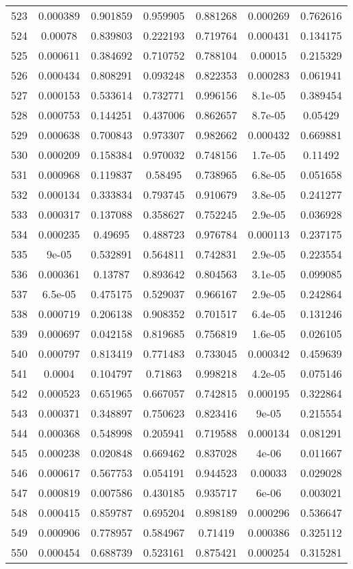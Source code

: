 \begin{table}
\begin{tabular}{c|c|c|c|c|c|c}
523 & 0.000389 & 0.901859 & 0.959905 & 0.881268 & 0.000269 & 0.762616\\
524 & 0.00078 & 0.839803 & 0.222193 & 0.719764 & 0.000431 & 0.134175\\
525 & 0.000611 & 0.384692 & 0.710752 & 0.788104 & 0.00015 & 0.215329\\
526 & 0.000434 & 0.808291 & 0.093248 & 0.822353 & 0.000283 & 0.061941\\
527 & 0.000153 & 0.533614 & 0.732771 & 0.996156 & 8.1e-05 & 0.389454\\
528 & 0.000753 & 0.144251 & 0.437006 & 0.862657 & 8.7e-05 & 0.05429\\
529 & 0.000638 & 0.700843 & 0.973307 & 0.982662 & 0.000432 & 0.669881\\
530 & 0.000209 & 0.158384 & 0.970032 & 0.748156 & 1.7e-05 & 0.11492\\
531 & 0.000968 & 0.119837 & 0.58495 & 0.738965 & 6.8e-05 & 0.051658\\
532 & 0.000134 & 0.333834 & 0.793745 & 0.910679 & 3.8e-05 & 0.241277\\
533 & 0.000317 & 0.137088 & 0.358627 & 0.752245 & 2.9e-05 & 0.036928\\
534 & 0.000235 & 0.49695 & 0.488723 & 0.976784 & 0.000113 & 0.237175\\
535 & 9e-05 & 0.532891 & 0.564811 & 0.742831 & 2.9e-05 & 0.223554\\
536 & 0.000361 & 0.13787 & 0.893642 & 0.804563 & 3.1e-05 & 0.099085\\
537 & 6.5e-05 & 0.475175 & 0.529037 & 0.966167 & 2.9e-05 & 0.242864\\
538 & 0.000719 & 0.206138 & 0.908352 & 0.701517 & 6.4e-05 & 0.131246\\
539 & 0.000697 & 0.042158 & 0.819685 & 0.756819 & 1.6e-05 & 0.026105\\
540 & 0.000797 & 0.813419 & 0.771483 & 0.733045 & 0.000342 & 0.459639\\
541 & 0.0004 & 0.104797 & 0.71863 & 0.998218 & 4.2e-05 & 0.075146\\
542 & 0.000523 & 0.651965 & 0.667057 & 0.742815 & 0.000195 & 0.322864\\
543 & 0.000371 & 0.348897 & 0.750623 & 0.823416 & 9e-05 & 0.215554\\
544 & 0.000368 & 0.548998 & 0.205941 & 0.719588 & 0.000134 & 0.081291\\
545 & 0.000238 & 0.020848 & 0.669462 & 0.837028 & 4e-06 & 0.011667\\
546 & 0.000617 & 0.567753 & 0.054191 & 0.944523 & 0.00033 & 0.029028\\
547 & 0.000819 & 0.007586 & 0.430185 & 0.935717 & 6e-06 & 0.003021\\
548 & 0.000415 & 0.859787 & 0.695204 & 0.898189 & 0.000296 & 0.536647\\
549 & 0.000906 & 0.778957 & 0.584967 & 0.71419 & 0.000386 & 0.325112\\
550 & 0.000454 & 0.688739 & 0.523161 & 0.875421 & 0.000254 & 0.315281\\
\end{tabular}
\end{table}
